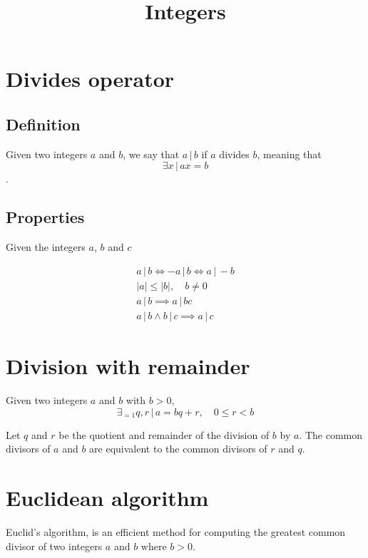 \documentclass[a4paper]{article}
\newcommand{\divides}{\,|\,}
\begin{document}
\title{Integers}
\genpage

\section{Divides operator}

\subsection{Definition}

Given two integers \(a\) and \(b\),
we say that \(a \divides b\) if \(a\) divides \(b\),
meaning that
\[
    \exists x \,|\, ax = b
\].

\subsection{Properties}

Given the integers \(a\), \(b\) and \(c\)

\begin{align*}
    a \divides b \iff -a \divides b \iff a \divides -b \\
    |a| \leq |b|, \quad b \neq 0 \\
    a \divides b \implies a \divides bc \\
    a \divides b \land b \divides c \implies a \divides c
\end{align*}

\section{Division with remainder}

Given two integers \(a\) and \(b\) with \(b > 0\),
\[
    \exists_{=1} q,r \,|\, a=bq+r, \quad 0 \leq r < b
\]


Let \(q\) and \(r\) be the quotient and remainder of the division of \(b\)
by \(a\).
The common divisors of \(a\) and \(b\) are equivalent to the common divisors of \(r\) and \(q\).


\section{Euclidean algorithm}

Euclid's algorithm, is an efficient method for computing the greatest common divisor of two integers
\(a\) and \(b\) where \(b > 0\).
\end{document}
